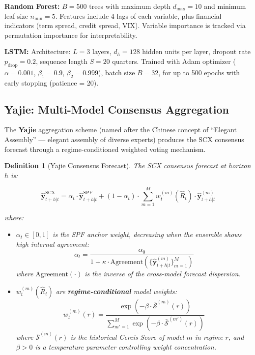 \documentclass[12pt,a4paper]{article}
\newtheorem{definition}[theorem]{Definition}
\begin{document}
\textbf{Random Forest:} $B = 500$ trees with maximum depth $d_{\max}
= 10$ and minimum leaf size $n_{\min} = 5$.  Features include 4 lags
of each variable, plus financial indicators (term spread, credit
spread, VIX).  Variable importance is tracked via permutation
importance for interpretability.

\textbf{LSTM:} Architecture: $L = 3$ layers, $d_h = 128$ hidden
units per layer, dropout rate $p_{\text{drop}} = 0.2$, sequence
length $S = 20$ quarters.  Trained with Adam optimizer
($\alpha = 0.001$, $\beta_1 = 0.9$, $\beta_2 = 0.999$), batch size
$B = 32$, for up to 500 epochs with early stopping (patience = 20).

\subsection{Yajie: Multi-Model Consensus Aggregation}

The \textbf{Yajie} aggregation scheme (named after the Chinese concept
of ``Elegant Assembly'' --- elegant assembly of diverse experts) produces the SCX
consensus forecast through a regime-conditioned weighted voting
mechanism.

\begin{definition}[Yajie Consensus Forecast]
\label{def:yajie}
The SCX consensus forecast at horizon $h$ is:

\begin{equation}
    \hat{\mathbf{y}}_{t+h|t}^{\text{SCX}} = \alpha_t \cdot
    \hat{\mathbf{y}}_{t+h|t}^{\text{SPF}} +
    (1 - \alpha_t) \cdot \sum_{m=1}^{M} w_t^{(m)}(\hat{R}_t) \cdot
    \hat{\mathbf{y}}_{t+h|t}^{(m)} \label{eq:yajie}
\end{equation}

where:
\begin{itemize}[leftmargin=*]
    \item $\alpha_t \in [0, 1]$ is the SPF anchor weight, decreasing
    when the ensemble shows high internal agreement:
    \begin{equation}
        \alpha_t = \frac{\alpha_0}{1 + \kappa \cdot
        \text{Agreement}(\{\hat{\mathbf{y}}_{t+h|t}^{(m)}\}_{m=1}^M)}
        \label{eq:alpha_anchor}
    \end{equation}
    where $\text{Agreement}(\cdot)$ is the inverse of the
    cross-model forecast dispersion.

    \item $w_t^{(m)}(\hat{R}_t)$ are \textbf{regime-conditional}
    model weights:
    \begin{equation}
        w_t^{(m)}(r) = \frac{\exp(-\beta \cdot \bar{\mathcal{S}}^{(m)}(r))}
        {\sum_{m'=1}^{M} \exp(-\beta \cdot \bar{\mathcal{S}}^{(m')}(r))}
        \label{eq:regime_weights}
    \end{equation}
    where $\bar{\mathcal{S}}^{(m)}(r)$ is the historical Cercis Score
    of model $m$ in regime $r$, and $\beta > 0$ is a temperature
    parameter controlling weight concentration.
\end{itemize}
\end{definition}
\end{document}

